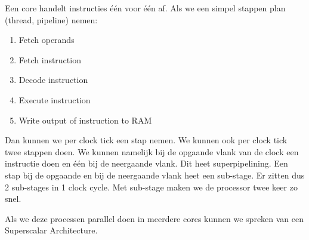 Een core handelt instructies \'e\'en voor \'e\'en af. Als we een simpel stappen plan (thread, pipeline) nemen:
\begin{enumerate}
\item Fetch operands
\item Fetch instruction
\item Decode instruction
\item Execute instruction
\item Write output of instruction to RAM
\end{enumerate}
Dan kunnen we per clock tick een stap nemen. We kunnen ook per clock tick twee stappen doen. We kunnen namelijk bij de opgaande vlank van de clock een instructie doen en \'e\'en bij de neergaande vlank. Dit heet superpipelining. Een stap bij de opgaande en bij de neergaande vlank heet een sub-stage. Er zitten dus 2 sub-stages in 1 clock cycle. Met sub-stage maken we de processor twee keer zo snel.

Als we deze processen parallel doen in meerdere cores kunnen we spreken van een Superscalar Architecture.

